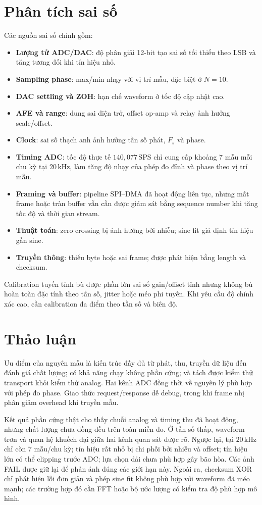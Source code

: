 \documentclass[12pt,a4paper]{report}
\newcommand{\unit}[1]{\,\mathrm{#1}}
\begin{document}
\section{Phân tích sai số}
Các nguồn sai số chính gồm:
\begin{itemize}
    \item \textbf{Lượng tử ADC/DAC}: độ phân giải 12-bit tạo sai số tối thiểu theo LSB và tăng tương đối khi tín hiệu nhỏ.
    \item \textbf{Sampling phase}: max/min nhạy với vị trí mẫu, đặc biệt ở $N=10$.
    \item \textbf{DAC settling và ZOH}: hạn chế waveform ở tốc độ cập nhật cao.
    \item \textbf{AFE và range}: dung sai điện trở, offset op-amp và relay ảnh hưởng scale/offset.
    \item \textbf{Clock}: sai số thạch anh ảnh hưởng tần số phát, $F_s$ và phase.
    \item \textbf{Timing ADC}: tốc độ thực tế $140{,}077\unit{SPS}$ chỉ cung cấp khoảng 7 mẫu mỗi chu kỳ tại $20\unit{kHz}$, làm tăng độ nhạy của phép đo đỉnh và phase theo vị trí mẫu.
    \item \textbf{Framing và buffer}: pipeline SPI--DMA đã hoạt động liên tục, nhưng mất frame hoặc tràn buffer vẫn cần được giám sát bằng sequence number khi tăng tốc độ và thời gian stream.
    \item \textbf{Thuật toán}: zero crossing bị ảnh hưởng bởi nhiễu; sine fit giả định tín hiệu gần sine.
    \item \textbf{Truyền thông}: thiếu byte hoặc sai frame; được phát hiện bằng length và checksum.
\end{itemize}

Calibration tuyến tính bù được phần lớn sai số gain/offset tĩnh nhưng không bù hoàn toàn đặc tính theo tần số, jitter hoặc méo phi tuyến. Khi yêu cầu độ chính xác cao, cần calibration đa điểm theo tần số và biên độ.

\section{Thảo luận}
Ưu điểm của nguyên mẫu là kiến trúc đầy đủ từ phát, thu, truyền dữ liệu đến đánh giá chất lượng; có khả năng chạy không phần cứng; và tách được kiểm thử transport khỏi kiểm thử analog. Hai kênh ADC đồng thời về nguyên lý phù hợp với phép đo phase. Giao thức request/response dễ debug, trong khi frame nhị phân giảm overhead khi truyền mẫu.

Kết quả phần cứng thật cho thấy chuỗi analog và timing thu đã hoạt động, nhưng chất lượng chưa đồng đều trên toàn miền đo. Ở tần số thấp, waveform trơn và quan hệ khuếch đại giữa hai kênh quan sát được rõ. Ngược lại, tại $20\unit{kHz}$ chỉ còn 7 mẫu/chu kỳ; tín hiệu rất nhỏ bị chi phối bởi nhiễu và offset; tín hiệu lớn có thể clipping trước ADC; lựa chọn dải chưa phù hợp gây bão hòa. Các ảnh FAIL được giữ lại để phản ánh đúng các giới hạn này. Ngoài ra, checksum XOR chỉ phát hiện lỗi đơn giản và phép sine fit không phù hợp với waveform đã méo mạnh; các trường hợp đó cần FFT hoặc bộ ước lượng có kiểm tra độ phù hợp mô hình.
\end{document}

